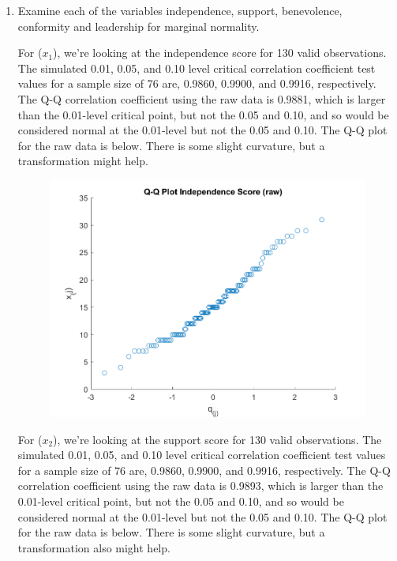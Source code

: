 \begin{enumerate}[label= (\alph*)]
    \item Examine each of the variables independence, support, benevolence, conformity and leadership for marginal normality.
    
    
    For ($x_{1}$), we're looking at the independence score for 130 valid observations.
    The simulated 0.01, 0.05, and 0.10 level critical correlation coefficient test values for a sample size of 76 are, 0.9860, 0.9900, and 0.9916, respectively.
    The Q-Q correlation coefficient using the raw data is 0.9881, which is larger than the 0.01-level critical point, but not the 0.05 and 0.10, and so would be considered normal at the 0.01-level but not the 0.05 and 0.10. 
    The Q-Q plot for the raw data is below. There is some slight curvature, but a transformation might help.

    \begin{center}
        \begin{figure}[H]
            \centering
            \includegraphics[scale=0.6]{./matlab/chapter-4/sol4.39.qq.1.png}
        \end{figure}
    \end{center}

    For ($x_{2}$), we're looking at the support score for 130 valid observations.
    The simulated 0.01, 0.05, and 0.10 level critical correlation coefficient test values for a sample size of 76 are, 0.9860, 0.9900, and 0.9916, respectively.
    The Q-Q correlation coefficient using the raw data is 0.9893, which is larger than the 0.01-level critical point, but not the 0.05 and 0.10, and so would be considered normal at the 0.01-level but not the 0.05 and 0.10. 
    The Q-Q plot for the raw data is below. There is some slight curvature, but a transformation also might help.


\end{enumerate}
